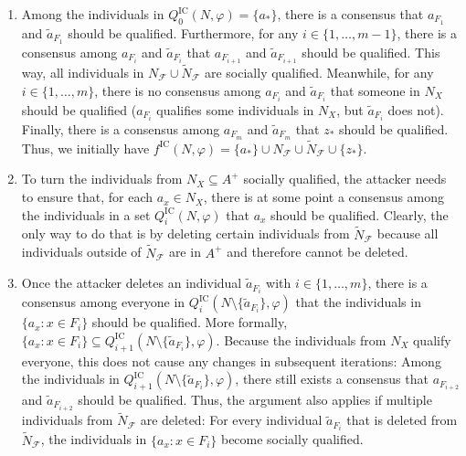 \documentclass[
    12pt,               %
    a4paper,            %
    bibtotoc,           %
    pointlessnumbers,   %
    ngerman,            %
    titlepage,          %
    leqno,              %
    ]{scrarticle}       %
\begin{document}
\begin{Proof}
\begin{enumerate}[
    topsep=-4pt,
    leftmargin=*,
    itemindent=4.96em,
    label={\textit{Fact \ref*{thm:ic_cgcdi_npc}.\arabic*}:},
    ref={\ref*{thm:ic_cgcdi_npc}.\arabic*}
]
\item \label{fact:ic_cgcdi_chain}
Among the individuals in $Q^{\text{IC}}_0(N, \varphi) = \{a_\ast\}$, there is a consensus that $a_{F_1}$ and $\tilde{a}_{F_1}$ should be qualified. Furthermore, for any $i \in \{ 1, \ldots, m-1 \}$, there is a consensus among $a_{F_i}$ and $\tilde{a}_{F_i}$ that $a_{F_{i+1}}$ and $\tilde{a}_{F_{i+1}}$ should be qualified. This way, all individuals in $N_\mathcal{F} \cup \tilde{N}_\mathcal{F}$ are socially qualified. Meanwhile, for any $i \in \{ 1, \ldots, m \}$, there is no consensus among $a_{F_i}$ and $\tilde{a}_{F_i}$ that someone in $N_X$ should be qualified ($a_{F_i}$ qualifies some individuals in $N_X$, but $\tilde{a}_{F_i}$ does not). Finally, there is a consensus among $a_{F_m}$ and $\tilde{a}_{F_m}$ that $z_\ast$ should be qualified. Thus, we initially have $f^{\text{IC}}(N, \varphi) = \{a_\ast\} \cup N_\mathcal{F} \cup \tilde{N}_\mathcal{F} \cup \{z_\ast\}$.

\item \label{fact:ic_cgcdi_must_delete_from_n_f}
To turn the individuals from $N_X \subseteq A^+$ socially qualified, the attacker needs to ensure that, for each $a_x \in N_X$, there is at some point a consensus among the individuals in a set $Q^{\text{IC}}_i(N, \varphi)$ that $a_x$ should be qualified. Clearly, the only way to do that is by deleting certain individuals from $\tilde{N}_\mathcal{F}$ because all individuals outside of $\tilde{N}_\mathcal{F}$ are in $A^+$ and therefore cannot be deleted.

\item \label{fact:ic_cgcdi_delete_some_n_f}
Once the attacker deletes an individual $\tilde{a}_{F_i}$ with $i \in \{ 1, \ldots, m \}$, there is a consensus among everyone in $Q^{\text{IC}}_i(N \setminus \{\tilde{a}_{F_i}\}, \varphi)$ that the individuals in $\{ a_x : x \in F_i \}$ should be qualified. More formally, $\{ a_x : x \in F_i \} \subseteq Q^{\text{IC}}_{i+1}(N \setminus \{\tilde{a}_{F_i}\}, \varphi)$. Because the individuals from $N_X$ qualify everyone, this does not cause any changes in subsequent iterations: Among the individuals in $Q^{\text{IC}}_{i+1}(N \setminus \{\tilde{a}_{F_i}\}, \varphi)$, there still exists a consensus that $a_{F_{i+2}}$ and $\tilde{a}_{F_{i+2}}$ should be qualified. Thus, the argument also applies if multiple individuals from $\tilde{N}_\mathcal{F}$ are deleted: For every individual $\tilde{a}_{F_i}$ that is deleted from $\tilde{N}_\mathcal{F}$, the individuals in $\{ a_x : x \in F_i \}$ become socially qualified.


\end{enumerate}
\end{Proof}
\end{document}
